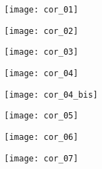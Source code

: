 \ifprof

\question{}
\begin{center}
\texttt{[image: cor\_01]}
\end{center}

\question{}
\begin{center}
\texttt{[image: cor\_02]}
\end{center}

\question{}
\begin{center}
\texttt{[image: cor\_03]}
\end{center}

\question{}
\begin{center}
\texttt{[image: cor\_04]}

\texttt{[image: cor\_04\_bis]}
\end{center}

\question{}
\begin{center}
\texttt{[image: cor\_05]}
\end{center}

\question{}
\begin{center}
\texttt{[image: cor\_06]}
\end{center}

\question{}
\begin{center}
\texttt{[image: cor\_07]}
\end{center}
%
%
%
%

\else
\fi
